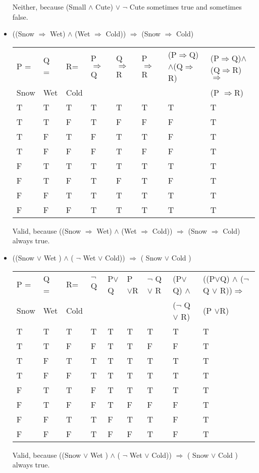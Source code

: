\documentclass{article}
\begin{document}
\begin{itemize}
\begin{center}
\begin{tabular}{ |l|l|l|l|l|}
      \end{tabular}
      \end{center}
      Neither, because (Small $\wedge$ Cute) $\vee$ $\neg$ Cute sometimes true and sometimes false.
    \item ((Snow $\Rightarrow$ Wet) $\wedge$ (Wet $\Rightarrow$ Cold)) $\Rightarrow$ (Snow $\Rightarrow$ Cold)
    \begin{center}
      \begin{tabular}{ |l|l|l|l|l|l|l|l|}
        \hline
        P =  &  Q =   &R= & P$\Rightarrow$Q & Q$\Rightarrow$R  &  P $\Rightarrow$R &(P$\Rightarrow$Q)$\wedge$(Q$\Rightarrow$R) &(P$\Rightarrow$Q)$\wedge$(Q$\Rightarrow$R) $\Rightarrow$ \\ 
        Snow &Wet &Cold && & &&(P $\Rightarrow$R)\\ \hline
        T & T &T&T&T&T&T&T\\ \hline
        T & T &F&T&F&F&F&T\\ \hline
        T & F &T&F&T&T&F&T\\ \hline
        T & F &F&F&T&F&F&T\\ \hline
        F & T &T&T&T&T&T&T\\ \hline
        F & T &F&T&F&T&F&T\\ \hline
        F & F &T&T&T&T&T&T\\ \hline
        F & F &F&T&T&T&T&T\\ \hline
      \end{tabular}
      \end{center}
      Valid, because ((Snow $\Rightarrow$ Wet) $\wedge$ (Wet $\Rightarrow$ Cold)) $\Rightarrow$ (Snow $\Rightarrow$ Cold) always true.
    \item ((Snow $\vee$ Wet ) $\wedge$ ( $\neg$ Wet $\vee$ Cold)) $\Rightarrow$ ( Snow $\vee$ Cold )
    \begin{center}
      \begin{tabular}{ |l|l|l|l|l|l|l|l|l|}
        \hline
        P =  &  Q =   &R= & $\neg$Q & P$\vee$Q  &  P $\vee$R &$\neg$ Q $\vee$ R &(P$\vee$Q) $\wedge$ &((P$\vee$Q) $\wedge$ ($\neg$ Q $\vee$ R))$\Rightarrow$\\ 
        Snow &Wet &Cold &&& & &($\neg$ Q $\vee$ R)&(P $\vee$R)\\ \hline
        T & T &T&T&T&T&T&T&T\\ \hline
        T & T &F&F&T&T&F&F&T\\ \hline
        T & F &T&T&T&T&T&T&T\\ \hline
        T & F &F&T&T&T&T&T&T\\ \hline
        F & T &T&F&T&T&T&T&T\\ \hline
        F & T &F&F&T&F&F&F&T\\ \hline
        F & F &T&T&F&T&T&F&T\\ \hline
        F & F &F&T&F&F&T&F&T\\ \hline
      \end{tabular}
      \end{center}
      Valid, because ((Snow $\vee$ Wet ) $\wedge$ ( $\neg$ Wet $\vee$ Cold)) $\Rightarrow$ ( Snow $\vee$ Cold ) always true.
\end{itemize}
 
\end{document}
